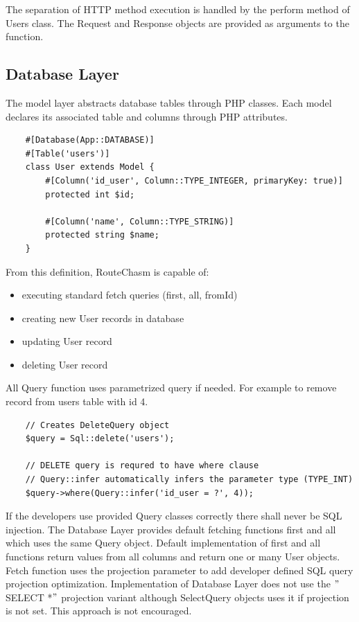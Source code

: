 The separation of HTTP method execution is handled by the perform method of Users class.
The Request and Response objects are provided as arguments to the function.

\subsection{Database Layer}\label{subsec:database-layer}
The model layer abstracts database tables through PHP classes.
Each model declares its associated table and columns through PHP attributes.

\begin{verbatim}
    #[Database(App::DATABASE)]
    #[Table('users')]
    class User extends Model {
        #[Column('id_user', Column::TYPE_INTEGER, primaryKey: true)]
        protected int $id;

        #[Column('name', Column::TYPE_STRING)]
        protected string $name;
    }
\end{verbatim}

From this definition, RouteChasm is capable of:

\begin{itemize}
    \item executing standard fetch queries (first, all, fromId)
    \item creating new User records in database
    \item updating User record
    \item deleting User record
\end{itemize}

All Query function uses parametrized query if needed.
For example to remove record from users table with id 4.

\begin{verbatim}
    // Creates DeleteQuery object
    $query = Sql::delete('users');

    // DELETE query is requred to have where clause
    // Query::infer automatically infers the parameter type (TYPE_INT)
    $query->where(Query::infer('id_user = ?', 4));
\end{verbatim}

If the developers use provided Query classes correctly there shall never be SQL injection.
The Database Layer provides default fetching functions first and all which uses the same Query object.
Default implementation of first and all functions return values from all columns and return one or many User objects.
Fetch function uses the projection parameter to add developer defined SQL query projection optimization.
Implementation of Database Layer does not use the \("\)SELECT *\("\) projection variant although SelectQuery objects
uses it if projection is not set.
This approach is not encouraged.

